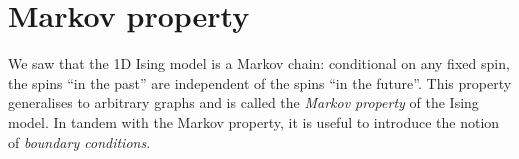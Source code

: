 

\section{Markov property}

We saw that the 1D Ising model is a Markov chain:
conditional on any fixed spin, the spins ``in the past''
are independent of the spins ``in the future''.
This property generalises to arbitrary graphs
and is called the \emph{Markov property} of the Ising model.
In tandem with the Markov property, it is useful to introduce the notion of
\emph{boundary conditions}.

